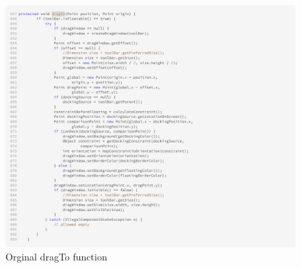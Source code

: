 \begin{figure}[H]
    \centering
    \includegraphics[width=\linewidth]{pic/dragTo.png}
    \caption{Orginal dragTo function}
    \label{fig:Orginal dragTo function}
\end{figure}


